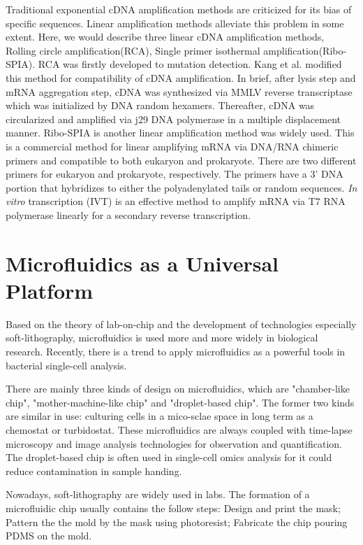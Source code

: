 \documentclass[fleqn,10pt]{wlscirep}
\begin{document}
Traditional exponential cDNA amplification methods are criticized for its bias of specific sequences. Linear amplification methods alleviate this problem in some extent. Here, we would describe three linear cDNA amplification methods, Rolling circle amplification(RCA), Single primer isothermal amplification(Ribo-SPIA). RCA was firstly developed to mutation detection\cite{Lizardi1998}. Kang et al.\cite{Kang2011} modified this method for compatibility of cDNA amplification. In brief, after lysis step and mRNA aggregation step, cDNA was synthesized via MMLV reverse transcriptase which was initialized by DNA random hexamers. Thereafter, cDNA was circularized and amplified via j29 DNA polymerase in a multiple displacement manner. Ribo-SPIA is another linear amplification method was widely used\cite{Kurn2005, Wang2015, Chen2017}. This is a commercial method for linear amplifying mRNA via DNA/RNA chimeric primers and compatible to both eukaryon and prokaryote. There are two different primers for eukaryon and prokaryote, respectively. The primers have a 3’ DNA portion that hybridizes to either the polyadenylated tails or random sequences. \emph{In vitro} transcription (IVT) is an effective method to amplify mRNA via T7 RNA polymerase linearly for a secondary reverse transcription\cite{Baugh2001}.

\section[]{Microfluidics as a Universal Platform}

Based on the theory of lab-on-chip and the development of technologies especially soft-lithography\cite{Unger2000}, microfluidics is used more and more widely in biological research. Recently, there is a trend to apply microfluidics as a powerful tools in bacterial single-cell analysis. 

There are mainly three kinds of design on microfluidics, which are "chamber-like chip", "mother-machine-like chip" and "droplet-based chip". The former two kinds are similar in use: culturing cells in a mico-sclae space in long term as a chemostat or turbidostat. These microfluidics are always coupled with time-lapse microscopy and image analysis technologies for observation and quantification. The droplet-based chip is often used in single-cell omics analysis for it could reduce contamination in sample handing. 

Nowadays, soft-lithography are widely used in labs. The formation of a microfluidic chip usually contains the follow steps\cite{Ferry2011}: Design and print the mask; Pattern the the mold by the mask using photoresist; Fabricate the chip pouring PDMS on the mold.
\end{document}
